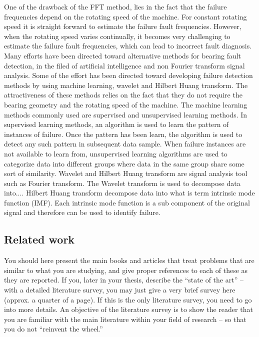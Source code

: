\documentclass[../Main/thesis.tex]{subfiles}
\begin{document}
\justify
One of the drawback of the FFT method, lies in the fact that the failure frequencies depend on the rotating speed of the machine. For constant rotating speed it is straight forward to estimate the failure fault frequencies. However, when the rotating speed varies continually, it becomes very challenging to estimate the failure fault frequencies, which can lead to incorrect fault diagnosis.
\justify
Many efforts have been directed toward alternative methods for bearing fault detection, in the filed of artificial intelligence and non Fourier transform signal analysis. Some of the effort has been directed toward developing failure detection methods by using machine learning, wavelet and Hilbert Huang transform. The attractiveness of these methods relies on the fact that they do not require the bearing geometry and the rotating speed of the machine. 
\justify
The machine learning methods commonly used are supervised and unsupervised learning methods. In supervised learning methods, an algorithm is used to learn the pattern of instances of failure. Once the pattern has been learn, the algorithm is used to detect any such pattern in subsequent data sample. When failure instances are not available to learn from, unsupervised learning algorithms are used to categorize data into different groups where data in the same group share some sort of similarity.
\justify
Wavelet and Hilbert Huang transform are signal analysis tool such as Fourier transform. The Wavelet transform is used to decompose data into.... Hilbert Huang transform decompose data into what is term intrinsic mode function (IMF). Each intrinsic mode function is a sub component of the original signal and therefore can be used to identify failure.
\subsection*{Related work}
You should here present the main books and articles that treat problems that are similar to what  you are studying, and give proper references to each of these as they are reported. 
If you,  later in your thesis, describe the ``state of the art'' -- with a detailed literature survey, you may just give a very brief survey here (approx. a quarter of a page). 
If this is the only literature survey, you need to go into more details. 
An objective of the literature survey is to show the reader that you are familiar with the main literature within your field of research -- so that you do not ``reinvent the wheel.''
\end{document}
